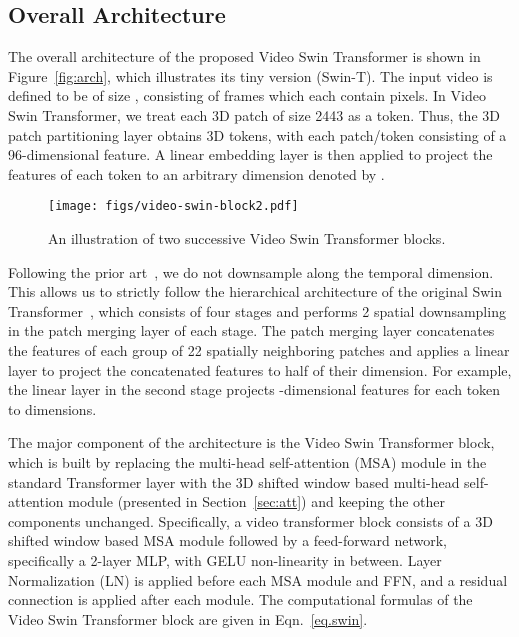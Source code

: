 \documentclass{article}
\begin{document}
\subsection{Overall Architecture}

The overall architecture of the proposed Video Swin Transformer is shown in Figure~\ref{fig:arch}, which illustrates its tiny version (Swin-T). 
The input video is defined to be of size , consisting of  frames which each contain  pixels.
In Video Swin Transformer, we treat each 3D patch of size 2443 as a token.
Thus, the 3D patch partitioning layer obtains  3D tokens, with each patch/token consisting of a 96-dimensional feature. 
A linear embedding layer is then applied to project the features of each token to an arbitrary dimension denoted by .

\begin{wrapfigure}{r}{0.38\linewidth}
    \centering
    \texttt{[image: figs/video-swin-block2.pdf]}
    \caption{An illustration of two successive Video Swin Transformer blocks.}
    \label{fig:blk}
\end{wrapfigure}

Following the prior art~\cite{qiu2017P3D,xie2018rethinking,feichtenhofer2019slowfast,feichtenhofer2020x3d}, we do not downsample along the temporal dimension. This allows us to strictly follow the hierarchical architecture of the original Swin Transformer~\cite{liu2021swin}, which consists of four stages and performs 2 spatial downsampling in the patch merging layer of each stage. The patch merging layer concatenates the features of each group of 22 spatially neighboring patches and applies a linear layer to project the concatenated features to half of their dimension. For example, the linear layer in the second stage projects -dimensional features for each token to  dimensions.

The major component of the architecture is the Video Swin Transformer block, which is built by replacing the multi-head self-attention (MSA) module in the standard Transformer layer with the 3D shifted window based multi-head self-attention module (presented in Section~\ref{sec:att}) and keeping the other components unchanged.
Specifically, a video transformer block consists of a 3D shifted window based MSA module followed by a feed-forward network, specifically a 2-layer MLP, with GELU non-linearity in between. Layer Normalization (LN) is applied before each MSA module and FFN, and a residual connection is applied after each module.
The computational formulas of the Video Swin Transformer block are given in Eqn.~\eqref{eq.swin}.
\end{document}
